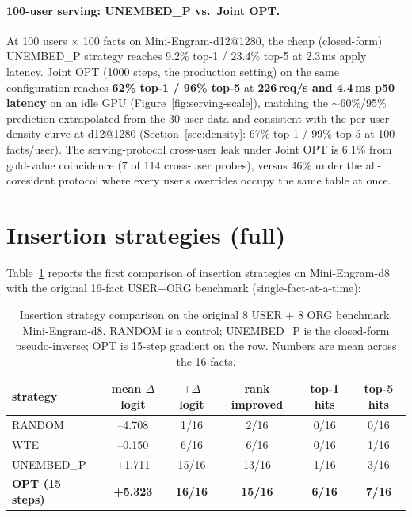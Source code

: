 \documentclass[11pt]{article}
\begin{document}
\paragraph{100-user serving: UNEMBED\_P vs.\ Joint OPT.}
At 100 users $\times$ 100 facts on Mini-Engram-d12@1280, the
cheap (closed-form) UNEMBED\_P strategy reaches 9.2\% top-1 /
23.4\% top-5 at 2.3\,ms apply latency. Joint OPT (1000 steps,
the production setting) on the same configuration reaches
\textbf{62\% top-1 / 96\% top-5} at \textbf{226\,req/s and
4.4\,ms p50 latency} on an idle GPU
(Figure~\ref{fig:serving-scale}), matching the $\sim$60\%/95\%
prediction extrapolated from the 30-user data and consistent
with the per-user-density curve at d12@1280
(Section~\ref{sec:density}: 67\% top-1 / 99\% top-5
at 100 facts/user). The serving-protocol cross-user leak under
Joint OPT is 6.1\% from gold-value coincidence (7 of 114
cross-user probes), versus 46\% under the all-coresident
protocol where every user's overrides occupy the same table at
once.

\section{Insertion strategies (full)}
\label{app:strategies-full}

Table~\ref{tab:strategies-full} reports the first comparison of
insertion strategies on Mini-Engram-d8 with
the original 16-fact USER+ORG benchmark (single-fact-at-a-time):

\begin{table}[t]
  \centering
  \caption{Insertion strategy comparison on the original 8 USER + 8 ORG
  benchmark, Mini-Engram-d8. RANDOM is a control; UNEMBED\_P is the
  closed-form pseudo-inverse; OPT is 15-step gradient on the row.
  Numbers are mean across the 16 facts.}
  \label{tab:strategies-full}
  \begin{tabular}{lccccc}
    \toprule
    strategy & mean $\Delta$logit & $+\Delta$logit & rank improved & top-1 hits & top-5 hits \\
    \midrule
    RANDOM   & --4.708 & 1/16 & 2/16 & 0/16 & 0/16 \\
    WTE      & --0.150 & 6/16 & 6/16 & 0/16 & 1/16 \\
    UNEMBED\_P & +1.711 & 15/16 & 13/16 & 1/16 & 3/16 \\
    \textbf{OPT (15 steps)} & \textbf{+5.323} & \textbf{16/16} & \textbf{15/16} & \textbf{6/16} & \textbf{7/16} \\
    \bottomrule
  \end{tabular}
\end{table}
\end{document}
